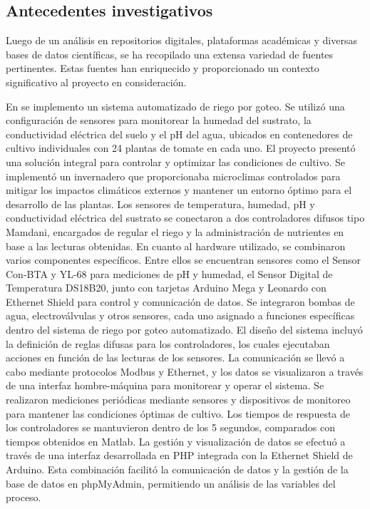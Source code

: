 \subsection{Antecedentes investigativos}
Luego de un análisis en repositorios digitales, plataformas académicas y
diversas bases de datos científicas, se ha recopilado una extensa variedad de
fuentes pertinentes. Estas fuentes han enriquecido y proporcionado un contexto
significativo al proyecto en consideración.

\bigbreak
En \cite{lema_holguin_implementacion_2018} se implemento un sistema automatizado de riego por goteo. Se utilizó una configuración de sensores para monitorear la humedad del sustrato, la conductividad eléctrica del suelo y el pH del agua, ubicados en contenedores de cultivo individuales con 24 plantas de tomate en cada uno. El proyecto presentó una solución integral para controlar y optimizar las condiciones de cultivo. Se implementó un invernadero que proporcionaba microclimas controlados para mitigar los impactos climáticos externos y mantener un entorno óptimo para el desarrollo de las plantas. Los sensores de temperatura, humedad, pH y conductividad eléctrica del sustrato se conectaron a dos controladores difusos tipo Mamdani, encargados de regular el riego y la administración de nutrientes en base a las lecturas obtenidas. En cuanto al hardware utilizado, se combinaron varios componentes específicos. Entre ellos se encuentran sensores como el Sensor Con-BTA y YL-68 para mediciones de pH y humedad, el Sensor Digital de Temperatura DS18B20, junto con tarjetas Arduino Mega y Leonardo con Ethernet Shield para control y comunicación de datos. Se integraron bombas de agua, electroválvulas y otros sensores, cada uno asignado a funciones específicas dentro del sistema de riego por goteo automatizado. El diseño del sistema incluyó la definición de reglas difusas para los controladores, los cuales ejecutaban acciones en función de las lecturas de los sensores. La comunicación se llevó a cabo mediante protocolos Modbus y Ethernet, y los datos se visualizaron a través de una interfaz hombre-máquina para monitorear y operar el sistema. Se realizaron mediciones periódicas mediante sensores y dispositivos de monitoreo para mantener las condiciones óptimas de cultivo. Los tiempos de respuesta de los controladores se mantuvieron dentro de los 5 segundos, comparados con tiempos obtenidos en Matlab. La gestión y visualización de datos se efectuó a través de una interfaz desarrollada en PHP integrada con la Ethernet Shield de Arduino. Esta combinación facilitó la comunicación de datos y la gestión de la base de datos en phpMyAdmin, permitiendo un análisis de las variables del proceso.

